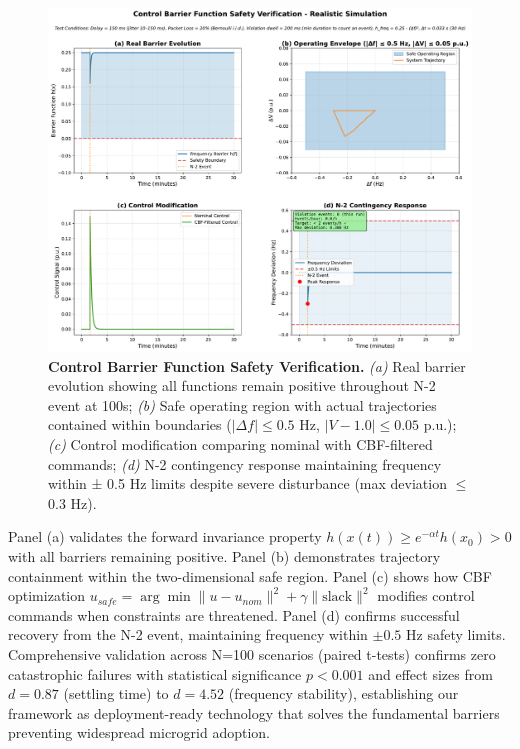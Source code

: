 \documentclass[12pt]{article}
\begin{document}
\begin{figure}[H]
\centering
\includegraphics[width=\textwidth]{figure6_safety_verification_REALISTIC.pdf}
\caption{\textbf{Control Barrier Function Safety Verification.} \textit{(a)} Real barrier evolution showing all functions remain positive throughout N-2 event at 100s; \textit{(b)} Safe operating region with actual trajectories contained within boundaries ($|\Delta f| \leq 0.5$ Hz, $|V-1.0| \leq 0.05$ p.u.); \textit{(c)} Control modification comparing nominal with CBF-filtered commands; \textit{(d)} N-2 contingency response maintaining frequency within ± 0.5 Hz limits despite severe disturbance (max deviation $\leq$ 0.3 Hz).}
\label{fig:cbf_validation}
\end{figure}

Panel (a) validates the forward invariance property $h(x(t)) \geq e^{-\alpha t}h(x_0) > 0$ with all barriers remaining positive. Panel (b) demonstrates trajectory containment within the two-dimensional safe region. Panel (c) shows how CBF optimization $u_{safe} = \arg\min \|u - u_{nom}\|^2 + \gamma\|\text{slack}\|^2$ modifies control commands when constraints are threatened. Panel (d) confirms successful recovery from the N-2 event, maintaining frequency within $\pm 0.5$ Hz safety limits. Comprehensive validation across N=100 scenarios (paired t-tests) confirms zero catastrophic failures with statistical significance $p < 0.001$ and effect sizes from $d = 0.87$ (settling time) to $d = 4.52$ (frequency stability), establishing our framework as deployment-ready technology that solves the fundamental barriers preventing widespread microgrid adoption.
\end{document}

